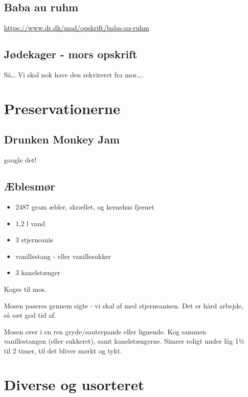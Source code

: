 \documentclass[
]{book}
\providecommand{\tightlist}{%
  \setlength{\itemsep}{0pt}\setlength{\parskip}{0pt}}
\begin{document}
\section{Baba au ruhm}\label{baba-au-ruhm}

\url{https://www.dr.dk/mad/opskrift/baba-au-ruhm}

\section{Jødekager - mors opskrift}\label{juxf8dekager---mors-opskrift}

Så\ldots{} Vi skal nok have den rekvireret fra mor\ldots.

\chapter{Preservationerne}\label{preservationerne}

\section{Drunken Monkey Jam}\label{drunken-monkey-jam}

google det!

\section{Æblesmør}\label{uxe6blesmuxf8r}

\begin{itemize}
\tightlist
\item
  2487 gram æbler, skrællet, og kernehus fjernet
\item
  1,2 l vand
\item
  3 stjerneanis
\item
  vanillestang - eller vanillesukker
\item
  3 kanelstænger
\end{itemize}

Koges til mos.

Mosen paseres gennem sigte - vi skal af med stjerneanisen.
Det er hård arbejde, så sæt god tid af.

Mosen over i en ren gryde/sauterpande eller lignende.
Kog sammen vanillestangen (eller sukkeret), samt kanelstængerne.
Simrer roligt under låg 1½ til 2 timer, til det bliver mørkt og tykt.

\chapter{Diverse og usorteret}\label{diverse-og-usorteret}
\end{document}
